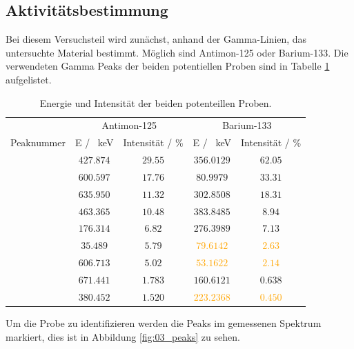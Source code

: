 \subsection{Aktivitätsbestimmung}
Bei diesem Versuchsteil wird zunächst, anhand der Gamma-Linien, das untersuchte Material bestimmt.
Möglich sind Antimon-125 oder Barium-133.
Die verwendeten Gamma Peaks der beiden potentiellen Proben sind in Tabelle \ref{tab:Ba_133Sb_125} aufgelistet.
\FloatBarrier
\begin{table}
  \centering
  \caption{Energie und Intensität der beiden potenteillen Proben.}
  \label{tab:Ba_133Sb_125}
  \begin{tabular}{c c c c c}
    \toprule
    & \multicolumn{2}{c}{Antimon-125} & \multicolumn{2}{c}{Barium-133} \\
    \cmidrule(lr){2-3}\cmidrule(lr){4-5}
    Peaknummer & E / \SI{}{\kilo\eV} & Intensität / \%& E / \SI{}{\kilo\eV} & Intensität / \%\\
    \midrule
    &$\num{427.874}$&$\num{29.55}$&$\num{356.0129}$&$\num{62.05}$\\
    &$\num{600.597}$&$\num{17.76}$&$\num{80.9979}$&$\num{33.31}$\\
    &$\num{635.950}$&$\num{11.32}$&$\num{302.8508}$&$\num{18.31}$\\
    &$\num{463.365}$&$\num{10.48}$&$\num{383.8485}$&$\num{8.94}$\\
    &$\num{176.314}$&$\num{6.82}$ &$\num{276.3989}$&$\num{7.13}$\\
    &$\num{35.489}$&$\num{5.79}$  &\textcolor{orange}{$\num{79.6142}$}&\textcolor{orange}{$\num{2.63}$}\\
    &$\num{606.713}$&$\num{5.02}$ &\textcolor{orange}{$\num{53.1622}$}&\textcolor{orange}{$\num{2.14}$}\\
    &$\num{671.441}$&$\num{1.783}$&$\num{160.6121}$&$\num{0.638}$\\
    &$\num{380.452}$&$\num{1.520}$&\textcolor{orange}{$\num{223.2368}$}&\textcolor{orange}{$\num{0.450}$}\\
    \bottomrule
  \end{tabular}
\end{table}
\FloatBarrier
Um die Probe zu identifizieren werden die Peaks im gemessenen Spektrum markiert, dies ist in Abbildung \ref{fig:03_peaks} zu sehen.
\FloatBarrier
